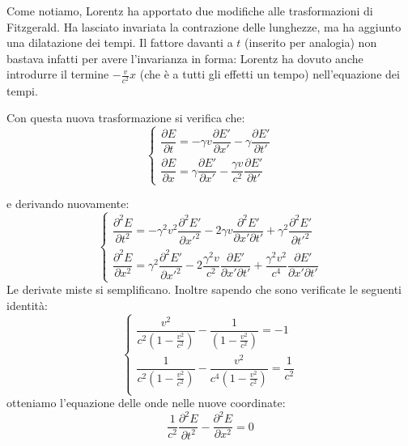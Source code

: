 Come notiamo, Lorentz ha apportato due modifiche alle trasformazioni
di Fitzgerald. Ha lasciato invariata la contrazione delle lunghezze, ma ha
aggiunto una dilatazione dei tempi. Il fattore davanti a $t$ (inserito per
analogia) non bastava infatti per avere l’invarianza in forma: Lorentz ha
dovuto anche introdurre il termine $- \frac{v}{c^2} x$ (che è a tutti gli effetti un tempo)
nell'equazione dei tempi.

Con questa nuova trasformazione si verifica che:
\begin{equation}
\left\{
  \begin{array}{ll}
  \dfrac{\partial E}{\partial t} = - \gamma v \dfrac{\partial E'}{\partial x'} - \gamma \dfrac{\partial E'}{\partial t'} \\
  \dfrac{\partial E}{\partial x} = \gamma \dfrac{\partial E'}{\partial x'} - \dfrac{\gamma v}{c^2}\dfrac{\partial E'}{\partial t'}                
  \end{array}\right.
\end{equation}

e derivando nuovamente:
\begin{equation}
\left\{
  \begin{array}{ll}
  \dfrac{\partial^2 E}{\partial t^2} = - \gamma^2 v^2 \dfrac{\partial^2 E'}{\partial x'^2} - 2 \gamma v \dfrac{\partial^2 E'}{\partial x' \partial t'} + \gamma^2 \dfrac{\partial^2 E'}{\partial t'^2}\\
  \dfrac{\partial^2 E}{\partial x^2} = \gamma^2 \dfrac{\partial^2 E'}{\partial x'^2} - 2 \dfrac{\gamma^2 v}{c^2}\dfrac{\partial E'}{\partial x' \partial t'} + \dfrac{\gamma^2 v^2}{c^4}\dfrac{\partial E'}{\partial x' \partial t'}
  \end{array}\right.
\end{equation}
Le derivate miste si semplificano. Inoltre sapendo che sono verificate le seguenti identità:
\begin{equation}
\left\{
  \begin{array}{ll}
  \dfrac{v^2}{c^2 \left(1 - \frac{v^2}{c^2}\right)} - \dfrac{1}{\left(1 - \frac{v^2}{c^2}\right)} = -1 \\
  \dfrac{1}{c^2 \left(1 - \frac{v^2}{c^2}\right)} - \dfrac{v^2}{c^4 \left(1 - \frac{v^2}{c^2}\right)} = \dfrac{1}{c^2} \\
  \end{array}\right.
\end{equation}
otteniamo l’equazione delle onde nelle nuove coordinate:
\begin{equation}
 \frac{1}{c^2} \dfrac{\partial^2 E}{\partial t^2} - \dfrac{\partial^2 E}{\partial x^2} = 0
\end{equation}

